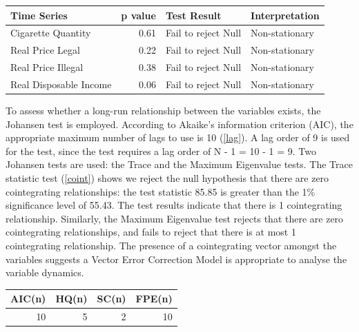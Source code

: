 \documentclass[11pt,preprint, authoryear]{elsarticle}
\let\origtable\table
\let\endorigtable\endtable
\renewenvironment{table}[1][2] {
    \expandafter\origtable\expandafter[H]
} {
    \endorigtable
}
\numberwithin{equation}{section}
\numberwithin{figure}{section}
\numberwithin{table}{section}
\begin{document}
\begin{table}[H]
\centering
\begin{tabular}{lrll}
  \hline
Time Series & p value & Test Result & Interpretation \\ 
  \hline
Cigarette Quantity & 0.61 & Fail to reject Null & Non-stationary \\ 
  Real Price Legal & 0.22 & Fail to reject Null & Non-stationary \\ 
  Real Price Illegal & 0.38 & Fail to reject Null & Non-stationary \\ 
  Real Disposable Income & 0.06 & Fail to reject Null & Non-stationary \\ 
   \hline
\end{tabular}
\caption{Augmented Dickey-Fuller Test \label{adf}} 
\end{table}

To assess whether a long-run relationship between the variables exists,
the Johansen test is employed. According to Akaike's information
criterion (AIC), the appropriate maximum number of lags to use is 10
(\ref{lag}). A lag order of 9 is used for the test, since the test
requires a lag order of N - 1 = 10 - 1 = 9. Two Johansen tests are used:
the Trace and the Maximum Eigenvalue tests. The Trace statistic test
(\ref{coint}) shows we reject the null hypothesis that there are zero
cointegrating relationships: the test statistic 85.85 is greater than
the 1\% significance level of 55.43. The test results indicate that
there is 1 cointegrating relationship. Similarly, the Maximum Eigenvalue
test rejects that there are zero cointegrating relationships, and fails
to reject that there is at most 1 cointegrating relationship. The
presence of a cointegrating vector amongst the variables suggests a
Vector Error Correction Model is appropriate to analyse the variable
dynamics.

\begin{table}[H]
\centering
\begin{tabular}{rrrr}
  \hline
AIC(n) & HQ(n) & SC(n) & FPE(n) \\ 
  \hline
 10 &   5 &   2 &  10 \\ 
   \hline
\end{tabular}
\caption{Optimal Lag Selection \label{lag}} 
\end{table}
\end{document}
